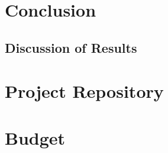 \documentclass[
    11pt,           %
    letterpaper,    %
    oneside         %
]{report}           %
\begin{document}
\chapter{Conclusion}
    \section{Discussion of Results}




\begin{appendices}

\chapter{Project Repository}
    \label{appendix:repository}
    

\chapter{Budget}

\end{appendices}
\clearpage
\listoftodos
\end{document}
